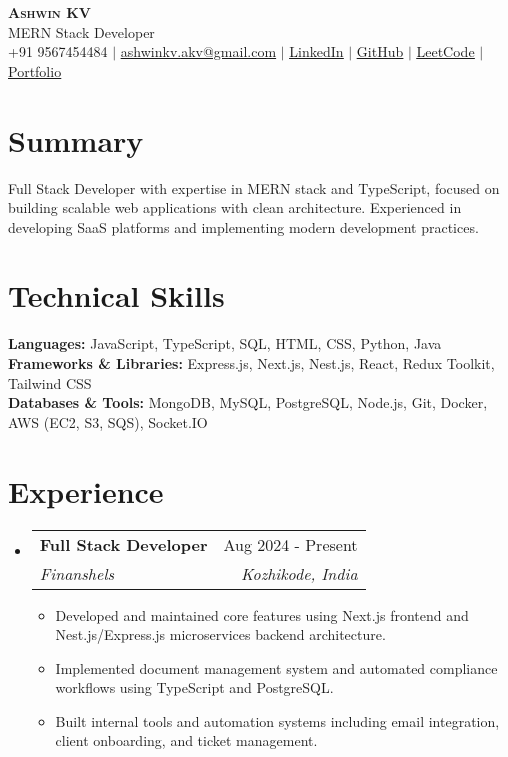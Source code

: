 \documentclass[letterpaper,11pt]{article}
\makeatletter
\newcommand{\resumeItem}[1]{\item\small{#1}}
\newcommand{\resumeSubheading}[4]{
  \vspace{-2pt}\item
    \begin{tabular*}{0.97\textwidth}[t]{l@{\extracolsep{\fill}}r}
      \textbf{#1} & #2 \\
      \textit{\small#3} & \textit{\small #4} \\
    \end{tabular*}\vspace{-8pt}
}
\newcommand{\resumeSubHeadingListStart}{\begin{itemize}[leftmargin=0.15in, label={}]}
\newcommand{\resumeSubHeadingListEnd}{\end{itemize}\vspace{-6pt}}
\newcommand{\resumeItemListStart}{\begin{itemize}}
\newcommand{\resumeItemListEnd}{\end{itemize}\vspace{-6pt}}
\makeatother
\begin{document}
\begin{center}
    \textbf{\Huge \scshape Ashwin KV} \\ \vspace{1pt}
    \small MERN Stack Developer \\
    \faPhone \hspace{1pt} +91 9567454484 $|$ 
    \href{mailto:ashwinkv.akv@gmail.com}{\faEnvelope \hspace{1pt} \color{blue}\underline{ashwinkv.akv@gmail.com}} $|$
    \faLinkedin \hspace{1pt} \href{https://www.linkedin.com/in/ashwin-kv/}{\color{blue}\underline{LinkedIn}} $|$
    \faGithub \href{https://github.com/dreamographer}{\color{blue}\underline{GitHub}} $|$
    \faGlobe \hspace{1pt} \href{https://leetcode.com/u/Ashwin_K_V/}{\color{blue}\underline{LeetCode}} $|$
    \faUser \hspace{1pt} \href{https://ashwinkv.vercel.app}{\color{blue}\underline{Portfolio}}
\end{center}

\vspace{-8pt}

\section{Summary}
Full Stack Developer with expertise in MERN stack and TypeScript, focused on building scalable web applications with clean architecture. Experienced in developing SaaS platforms and implementing modern development practices.

\section{Technical Skills}
\begin{itemize}[leftmargin=0.15in, label={}]
    \small{\item{
     \textbf{Languages:} JavaScript, TypeScript, SQL, HTML, CSS, Python, Java \\
     \textbf{Frameworks \& Libraries:} Express.js, Next.js, Nest.js, React, Redux Toolkit, Tailwind CSS \\
     \textbf{Databases \& Tools:} MongoDB, MySQL, PostgreSQL, Node.js, Git, Docker, AWS (EC2, S3, SQS), Socket.IO
    }}
\end{itemize}

\section{Experience}
\resumeSubHeadingListStart
\resumeSubheading
{Full Stack Developer}{Aug 2024 - Present}
{Finanshels}{Kozhikode, India}
\resumeItemListStart
\resumeItem{Developed and maintained core features using Next.js frontend and Nest.js/Express.js microservices backend architecture.}
\resumeItem{Implemented document management system and automated compliance workflows using TypeScript and PostgreSQL.}
\resumeItem{Built internal tools and automation systems including email integration, client onboarding, and ticket management.}
\resumeItemListEnd
\resumeSubHeadingListEnd
\end{document}
